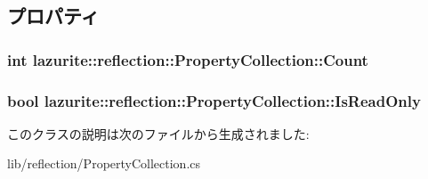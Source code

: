 \subsection{プロパティ}
\hypertarget{classlazurite_1_1reflection_1_1_property_collection_a7fdcbe4737dac05111d6c07fe79fd1ce}{
\subsubsection[{Count}]{\setlength{\rightskip}{0pt plus 5cm}int lazurite::reflection::PropertyCollection::Count}}
\label{classlazurite_1_1reflection_1_1_property_collection_a7fdcbe4737dac05111d6c07fe79fd1ce}
\hypertarget{classlazurite_1_1reflection_1_1_property_collection_a55aafcc1d4d4ab210670101179b4d7f6}{
\subsubsection[{IsReadOnly}]{\setlength{\rightskip}{0pt plus 5cm}bool lazurite::reflection::PropertyCollection::IsReadOnly}}
\label{classlazurite_1_1reflection_1_1_property_collection_a55aafcc1d4d4ab210670101179b4d7f6}


このクラスの説明は次のファイルから生成されました:\begin{DoxyCompactItemize}
\item 
lib/reflection/PropertyCollection.cs\end{DoxyCompactItemize}
